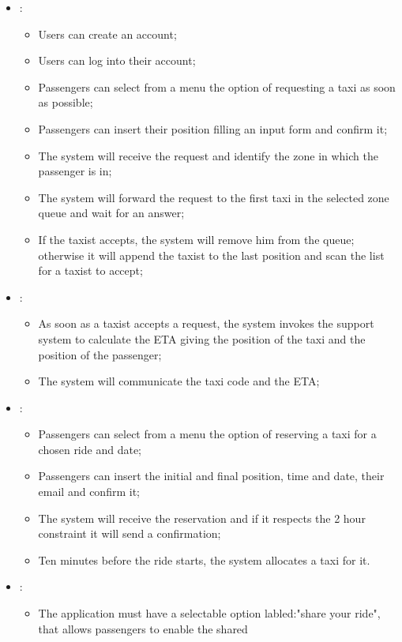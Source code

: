 \begin {itemize}
\item [G1]:
	\begin{itemize}
	\item Users can create an account;
	\item Users can log into their account;
	\item Passengers can select from a menu the option of requesting a taxi as soon as possible; 
	\item Passengers can insert their position filling an input form and confirm it;
	\item The system will receive the request and identify the zone in which the passenger is in;
	\item The system will forward the request to the first taxi in the selected zone queue and wait for an answer;
	\item If the taxist accepts, the system will remove him from the queue; otherwise it will append the taxist to the last position and
scan the list for a taxist to accept;
	\end{itemize}
\item [G2]:
	\begin{itemize}
	\item As soon as a taxist accepts a request, the system invokes the support system to calculate the ETA giving the position of the 
	taxi and the position of the passenger;
	\item The system will communicate the taxi code and the ETA;
	\end{itemize}
\item [G3]:
	\begin{itemize}
	\item Passengers can select from a menu the option of reserving a taxi for a chosen ride and date; 
	\item Passengers can insert the initial and final position, time and date, their email and confirm it;
	\item The system will receive the reservation and if it respects the 2 hour constraint it will send a confirmation;
	\item Ten minutes before the ride starts, the system allocates a taxi for it.
	\end{itemize}
\item [G4]:
	\begin{itemize}
	\item The application must have a selectable option labled:"share your ride", that allows passengers to enable the shared 

\end{itemize}
\end{itemize}
